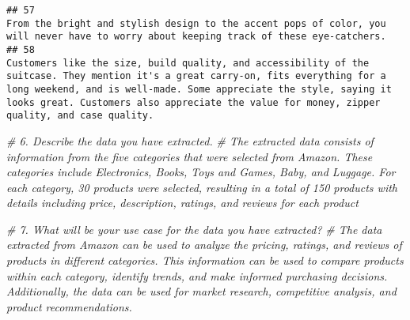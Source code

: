 \documentclass[
]{article}
\newenvironment{Shaded}{\begin{snugshade}}{\end{snugshade}}
\newcommand{\CommentTok}[1]{\textcolor[rgb]{0.56,0.35,0.01}{\textit{#1}}}
\begin{document}
\begin{verbatim}
## 57                                                                                                                                                                                                                                                                                                                                                                                                                                                                                   From the bright and stylish design to the accent pops of color, you will never have to worry about keeping track of these eye-catchers. 
## 58                                                                                                                                                                                                                                                                                                                    Customers like the size, build quality, and accessibility of the suitcase. They mention it's a great carry-on, fits everything for a long weekend, and is well-made. Some appreciate the style, saying it looks great. Customers also appreciate the value for money, zipper quality, and case quality.
\end{verbatim}

\begin{Shaded}
\begin{Highlighting}[]
\CommentTok{\# 6. Describe the data you have extracted.}
  \CommentTok{\# The extracted data consists of information from the five categories that were selected from Amazon. These categories include Electronics, Books, Toys and Games, Baby, and Luggage. For each category, 30 products were selected, resulting in a total of 150 products with details including price, description, ratings, and reviews for each product}
\end{Highlighting}
\end{Shaded}

\begin{Shaded}
\begin{Highlighting}[]
\CommentTok{\# 7. What will be your use case for the data you have extracted?}
  \CommentTok{\# The data extracted from Amazon can be used to analyze the pricing, ratings, and reviews of products in different categories. This information can be used to compare products within each category, identify trends, and make informed purchasing decisions. Additionally, the data can be used for market research, competitive analysis, and product recommendations.}
\end{Highlighting}
\end{Shaded}
\end{document}
